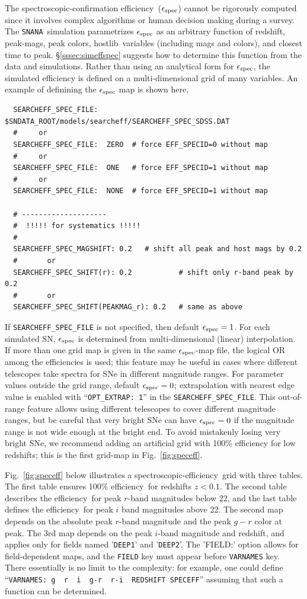 \documentclass[12pt]{article}
\newcommand{\snana}{{\tt SNANA}}
\newcommand{\hostlib}{{\sc hostlib}}
\newcommand{\eff}{efficiency}
\newcommand{\simeffspec}{\epsilon_{\rm spec}}
\newcommand{\spec}{spectroscopic}
\begin{document}
{The \spec-confirmation \eff\ ($\simeffspec$) cannot be rigorously computed
since it involves complex algorithms or human decision making during a survey.
The \snana\ simulation parametrizes $\simeffspec$ as an arbitrary
function of redshift, peak-mags, peak colors, \hostlib\ variables 
(including mags and colors), and closest time to peak.
\S\ref{sssec:simeffspec} suggests how to determine
this function from the data and simulations.
Rather than using an analytical form for $\simeffspec$,
the simulated efficiency is defined on a multi-dimensional
grid of many variables.
An example of definining the $\simeffspec$ map is shown here,
\begin{verbatim}
  SEARCHEFF_SPEC_FILE:  $SNDATA_ROOT/models/searcheff/SEARCHEFF_SPEC_SDSS.DAT
  #     or
  SEARCHEFF_SPEC_FILE:  ZERO  # force EFF_SPECID=0 without map
  #     or
  SEARCHEFF_SPEC_FILE:  ONE   # force EFF_SPECID=1 without map
  #     or
  SEARCHEFF_SPEC_FILE:  NONE  # force EFF_SPECID=1 without map
 
  # --------------------
  #  !!!!! for systematics !!!!!
  #
  SEARCHEFF_SPEC_MAGSHIFT: 0.2   # shift all peak and host mags by 0.2
  #       or
  SEARCHEFF_SPEC_SHIFT(r): 0.2           # shift only r-band peak by 0.2
  #       or
  SEARCHEFF_SPEC_SHIFT(PEAKMAG_r): 0.2   # same as above

\end{verbatim}
If \verb|SEARCHEFF_SPEC_FILE|  is not specified, then default $\simeffspec=1$.
For each simulated SN, $\simeffspec$ is determined from  multi-dimensional (linear) 
interpolation. 
If more than one grid map is given in the same $\simeffspec$-map file,
the logical OR among the efficiencies is used;
this feature may be useful in cases where different telescopes
take spectra for SNe in different magnitude ranges.
%
For parameter values outside the grid range, default $\simeffspec=0$;
extrapolation with nearest edge value is enabled with ``\verb|OPT_EXTRAP: 1|''
in the \verb|SEARCHEFF_SPEC_FILE|.
This out-of-range feature allows using different telescopes to cover
different magnitude ranges, but be careful that very bright
SNe can have $\simeffspec=0$ if the magnitude range is not
wide enough at the bright end. To avoid mistakenly losing 
very bright SNe, we recommend adding an artificial 
grid with 100\% efficiency for low redshifts;
this is the first grid-map in Fig.~\ref{fig:speceff}.


Fig.~\ref{fig:speceff} below illustrates a
\spec-\eff\ grid with three tables.
The first table ensures 100\% \eff\ for redshifts $z<0.1$.
The second table describes the \eff\ for peak $r$-band magnitudes 
below 22, and the last table defines the \eff\ for
peak $i$ band magnitudes above 22. 
The second map depends on the absolute peak $r$-band magnitude
and the peak $g-r$ color at peak.
The 3rd map depends on the peak $i$-band magnitude and redshift,
and applies only for fields named '\verb|DEEP1|' and '\verb|DEEP2|'.
The 'FIELD:' option allows for field-dependent maps,
and the \verb|FIELD| key must appear before \verb|VARNAMES| key.
There essentially is no limit to the complexity: 
for example, one could define 
``\verb|VARNAMES: g  r  i  g-r  r-i  REDSHIFT SPECEFF|''
assuming that such a function can be determined.

}
\end{document}
